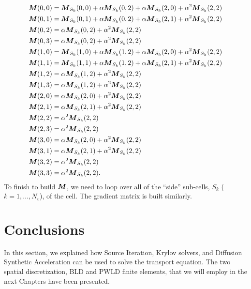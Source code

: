 {\allowdisplaybreaks
\begin{align}
  & \boldsymbol{M}(0,0) =  \boldsymbol{M}_{S_k}(0,0) + \alpha \boldsymbol{M}_{S_k}(0,2) + \alpha
  \boldsymbol{M}_{S_k}(2,0) + \alpha^2 \boldsymbol{M}_{S_k}(2,2)\\
  & \boldsymbol{M}(0,1) =  \boldsymbol{M}_{S_k}(0,1) + \alpha \boldsymbol{M}_{S_k}(0,2) + \alpha
  \boldsymbol{M}_{S_k}(2,1) + \alpha^2 \boldsymbol{M}_{S_k}(2,2)\\
  & \boldsymbol{M}(0,2) =  \alpha \boldsymbol{M}_{S_k}(0,2) + \alpha^2 \boldsymbol{M}_{S_k}(2,2)\\
  & \boldsymbol{M}(0,3) =  \alpha \boldsymbol{M}_{S_k}(0,2) + \alpha^2 \boldsymbol{M}_{S_k}(2,2)\\
  & \boldsymbol{M}(1,0) =  \boldsymbol{M}_{S_k}(1,0) + \alpha \boldsymbol{M}_{S_k}(1,2) + \alpha
  \boldsymbol{M}_{S_k}(2,0) + \alpha^2 \boldsymbol{M}_{S_k}(2,2)\\
  & \boldsymbol{M}(1,1) =  \boldsymbol{M}_{S_k}(1,1) + \alpha \boldsymbol{M}_{S_k}(1,2) + \alpha
  \boldsymbol{M}_{S_k}(2,1) + \alpha^2 \boldsymbol{M}_{S_k}(2,2)\\
  & \boldsymbol{M}(1,2) =  \alpha \boldsymbol{M}_{S_k}(1,2) + \alpha^2 \boldsymbol{M}_{S_k}(2,2)\\
  & \boldsymbol{M}(1,3) =  \alpha \boldsymbol{M}_{S_k}(1,2) + \alpha^2 \boldsymbol{M}_{S_k}(2,2)\\
  & \boldsymbol{M}(2,0) =  \alpha \boldsymbol{M}_{S_k}(2,0) + \alpha^2 \boldsymbol{M}_{S_k}(2,2)\\
  & \boldsymbol{M}(2,1) =  \alpha \boldsymbol{M}_{S_k}(2,1) + \alpha^2 \boldsymbol{M}_{S_k}(2,2)\\
  & \boldsymbol{M}(2,2) =  \alpha^2 \boldsymbol{M}_{S_k}(2,2)\\
  & \boldsymbol{M}(2,3) =  \alpha^2 \boldsymbol{M}_{S_k}(2,2)\\
  & \boldsymbol{M}(3,0) =  \alpha \boldsymbol{M}_{S_k}(2,0) + \alpha^2 \boldsymbol{M}_{S_k}(2,2)\\
  & \boldsymbol{M}(3,1) =  \alpha \boldsymbol{M}_{S_k}(2,1) + \alpha^2 \boldsymbol{M}_{S_k}(2,2)\\
  & \boldsymbol{M}(3,2) =  \alpha^2 \boldsymbol{M}_{S_k}(2,2)\\
  & \boldsymbol{M}(3,3) =  \alpha^2 \boldsymbol{M}_{S_k}(2,2). 
\end{align}}    
To finish to build $\boldsymbol{M}$, we need to loop over all of the ``side''
sub-cells, $S_k$ ($k=1,\hdots,N_v$), of the cell. The gradient matrix is built 
similarly.

\section{Conclusions}
In this section, we explained how Source Iteration, Krylov solvers, and
Diffusion Synthetic Acceleration can be used to solve the transport equation. 
The two spatial discretization, BLD and PWLD finite elements, that we will 
employ in the next Chapters have been presented.
